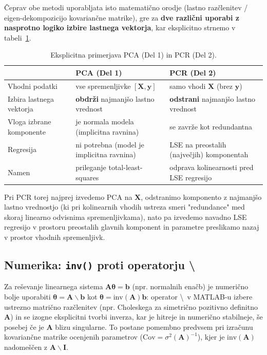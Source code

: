 \documentclass[a4paper, 11pt]{article}
\begin{document}
Čeprav obe metodi uporabljata isto matematično orodje (lastno razčlenitev /
eigen-dekompozicijo kovariančne matrike), gre za \textbf{dve različni uporabi z nasprotno
logiko izbire lastnega vektorja}, kar eksplicitno strnemo v tabeli~\ref{tab:pca-vs-pcr}.

\begin{table}[H]
\centering
\caption{Eksplicitna primerjava PCA (Del 1) in PCR (Del 2).}
\label{tab:pca-vs-pcr}
\begin{tabular}{@{}p{3cm}p{4.3cm}p{4.3cm}@{}}
\toprule
 & \textbf{PCA (Del 1)} & \textbf{PCR (Del 2)} \\
\midrule
Vhodni podatki & vse spremenljivke $[\mathbf{X},\mathbf{y}]$ & samo vhodi $\mathbf{X}$ (brez $\mathbf{y}$) \\
Izbira lastnega vektorja & \textbf{obdrži} najmanjšo lastno vrednost & \textbf{odstrani} najmanjšo lastno vrednost \\
Vloga izbrane komponente & je normala modela (implicitna ravnina) & se zavrže kot redundantna \\
Regresija & ni potrebna (model je implicitna ravnina) & LSE na preostalih (največjih) komponentah \\
Namen & prileganje total-least-squares & odprava kolinearnosti pred LSE regresijo \\
\bottomrule
\end{tabular}
\end{table}

Pri PCR torej najprej izvedemo PCA na $\mathbf{X}$, odstranimo komponento z najmanjšo
lastno vrednostjo (ki pri kolinearnih vhodih ustreza smeri "redundance" med skoraj
linearno odvisnima spremenljivkama), nato pa izvedemo navadno LSE regresijo v prostoru
preostalih glavnih komponent in parametre preslikamo nazaj v prostor vhodnih
spremenljivk.

\subsection{Numerika: \texttt{inv()} proti operatorju \textbackslash}

Za reševanje linearnega sistema $\mathbf{A}\boldsymbol{\theta}=\mathbf{b}$ (npr. normalnih
enačb) je numerično bolje uporabiti $\boldsymbol{\theta} = \mathbf{A}\backslash\mathbf{b}$
kot $\boldsymbol{\theta} = \mathrm{inv}(\mathbf{A})\mathbf{b}$: operator \textbackslash\
v MATLAB-u izbere ustrezno matrično razčlenitev (npr. Choleskega za simetrično pozitivno
definitno $\mathbf{A}$) in se izogne eksplicitni tvorbi inverza, kar je hitreje in
numerično stabilneje, še posebej če je $\mathbf{A}$ blizu singularne. To postane
pomembno predvsem pri izračunu kovariančne matrike ocenjenih parametrov
($\mathrm{Cov} = \sigma^2 (\mathbf{A})^{-1}$), kjer je $\mathrm{inv}(\mathbf{A})$
nadomeščen z $\mathbf{A}\backslash\mathbf{I}$.
\end{document}
